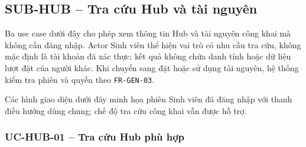 \newcommand{\HUBDiagramFigure}[3]{%
  \begingroup
  \setlength{\intextsep}{0pt}
  \InsertArtifact[0.90\textheight]{#1}{#2}{#3}{}
  \endgroup
}

\subsection{SUB-HUB -- Tra cứu Hub và tài nguyên}

Ba use case dưới đây cho phép xem thông tin Hub và tài nguyên công khai mà không cần đăng nhập. Actor Sinh viên thể hiện vai trò có nhu cầu tra cứu, không mặc định là tài khoản đã xác thực; kết quả không chứa danh tính hoặc dữ liệu lượt đặt của người khác. Khi chuyển sang đặt hoặc sử dụng tài nguyên, hệ thống kiểm tra phiên và quyền theo \texttt{FR-GEN-03}.

Các hình giao diện dưới đây minh họa phiên Sinh viên đã đăng nhập với thanh điều hướng dùng chung; chế độ tra cứu công khai vẫn được hỗ trợ.


\subsubsection{UC-HUB-01 -- Tra cứu Hub phù hợp}



